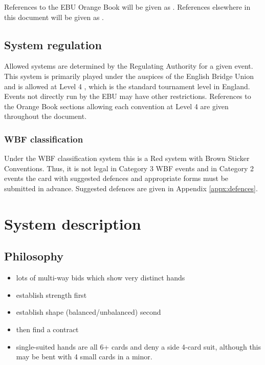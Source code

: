 \documentclass[a4paper,14pt]{extarticle}
\begin{document}
References to the EBU Orange Book will be given as . References
elsewhere in this document will be given as .

\subsection{System regulation}

Allowed systems are determined by the Regulating Authority for a given event.
This system is primarily played under the auspices of the English Bridge Union
and is allowed at Level 4 , which is the standard tournament level
in England. Events not directly run by the EBU may have other restrictions.
References to the Orange Book sections allowing each convention at Level 4 are
given throughout the document.

\subsubsection{WBF classification}

Under the WBF classification system this is a Red system with Brown Sticker
Conventions. Thus, it is not legal in Category 3 WBF events and in Category 2
events the card with suggested defences and appropriate forms must be submitted
in advance. Suggested defences are given in Appendix \ref{appx:defences}.

\newpage

\section{System description}
\label{sec:system}

\subsection{Philosophy}
\label{sec:philosophy}

\begin{itemize}
\item lots of multi-way bids which show very distinct hands
\item establish strength first
\item establish shape (balanced/unbalanced) second
\item then find a contract
\item single-suited hands are all 6+ cards and deny a side 4-card suit, although
this may be bent with 4 small cards in a minor.
\end{itemize}
\end{document}
